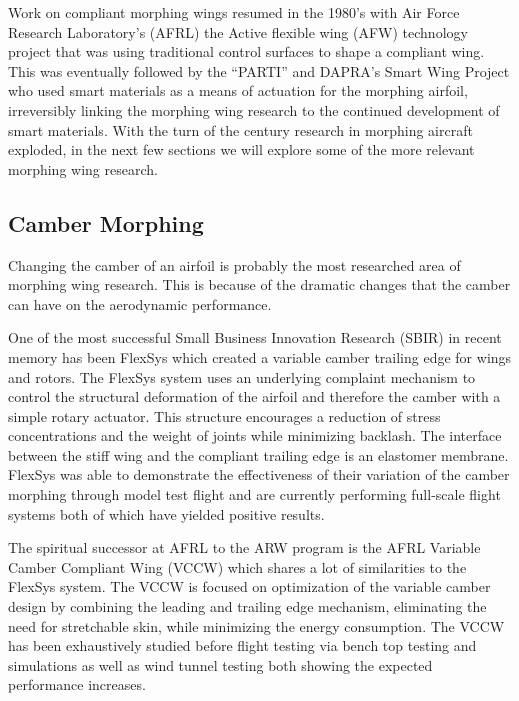 \documentclass[11pt]{ucthesis}
\begin{document}
Work on compliant morphing wings resumed in the 1980's with Air Force Research Laboratory's (AFRL) the Active flexible wing (AFW) technology project that was using traditional control surfaces to shape a compliant wing. \cite{miller1988active} This was eventually followed by the ``PARTI'' \cite{pinkerton1996controlled} and DAPRA's Smart Wing Project \cite{kudva2001overview} who used smart materials as a means of actuation for the morphing airfoil, irreversibly linking the morphing wing research to the continued development of smart materials. With the turn of the century research in morphing aircraft exploded, in the next few sections we will explore some of the more relevant morphing wing research.

\subsection{Camber Morphing}
Changing the camber of an airfoil is probably the most researched area of morphing wing research. This is because of the dramatic changes that the camber can have on the aerodynamic performance. 

One of the most successful Small Business Innovation Research (SBIR) in recent memory has been FlexSys which created a variable camber trailing edge for  wings\cite{kota2009mission} and rotors\cite{kota2008adaptive}. The FlexSys system uses an underlying complaint mechanism to control the structural deformation of the airfoil and therefore the camber with a simple rotary actuator. This structure encourages a reduction of stress concentrations and the weight of joints while minimizing backlash. The interface between the stiff wing and the compliant trailing edge is an elastomer membrane. FlexSys was able to demonstrate the effectiveness of their variation of the camber morphing through model test flight and are currently performing full-scale flight systems both of which have yielded positive results. 

The spiritual successor at AFRL to the ARW program is the AFRL Variable Camber Compliant Wing (VCCW) which shares a lot of similarities to the FlexSys system. The VCCW is focused on optimization of the variable camber design by combining the leading and trailing edge mechanism, eliminating the need for stretchable skin, while minimizing the energy consumption. The VCCW has been exhaustively studied before flight testing via bench top testing and simulations \cite{miller2015fluid} as well as wind tunnel testing \cite{zientarski2015wind} both showing the expected performance increases. 
\end{document}

